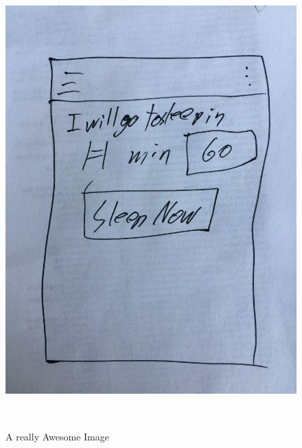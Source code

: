 \documentclass[twoside, letterpaper, american]{article}
\begin{document}
\begin{figure}[!htb]
  \includegraphics[width=\linewidth]{images/sleep.JPG}
  \caption{A really Awesome Image}\label{fig:sleep}
\endminipage\\\bigskip
{}%

\end{figure}
\end{document}
